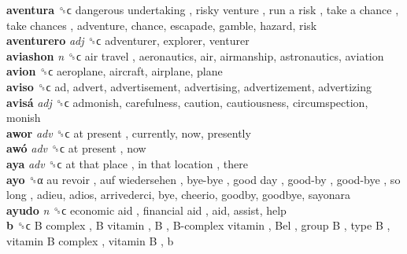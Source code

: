 \textbf{aventura} ␝ϲ   dangerous undertaking ,  risky venture ,  run a risk ,  take a chance ,  take chances , adventure, chance, escapade, gamble, hazard, risk  \\
\textbf{aventurero} \emph{adj}  ␝ϲ  adventurer, explorer, venturer  \\
\textbf{aviashon} \emph{n}  ␝ϲ   air travel , aeronautics, air, airmanship, astronautics, aviation  \\
\textbf{avion} ␝ϲ  aeroplane, aircraft, airplane, plane  \\
\textbf{aviso} ␝ϲ  ad, advert, advertisement, advertising, advertizement, advertizing  \\
\textbf{avisá} \emph{adj}  ␝ϲ  admonish, carefulness, caution, cautiousness, circumspection, monish  \\
\textbf{awor} \emph{adv}  ␝ϲ   at present , currently, now, presently  \\
\textbf{awó} \emph{adv}  ␝ϲ   at present , now  \\
\textbf{aya} \emph{adv}  ␝ϲ   at that place ,  in that location , there  \\
\textbf{ayo} ␝α   au revoir ,  auf wiedersehen ,  bye-bye ,  good day ,  good-by ,  good-bye ,  so long , adieu, adios, arrivederci, bye, cheerio, goodby, goodbye, sayonara  \\
\textbf{ayudo} \emph{n}  ␝ϲ   economic aid ,  financial aid , aid, assist, help  \\
\textbf{b} ␝ϲ   B complex ,  B vitamin ,  B ,  B-complex vitamin ,  Bel ,  group B ,  type B ,  vitamin B complex ,  vitamin B , b  \\
